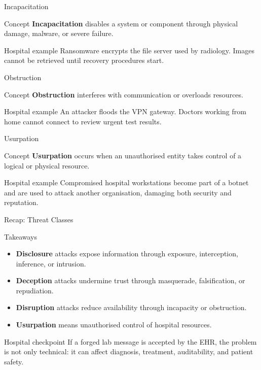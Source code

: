 \documentclass[presentation]{beamer}
\begin{document}
\begin{frame}[c]{Incapacitation}
\begin{block}{Concept}
\textbf{Incapacitation} disables a system or component through physical damage, malware, or severe
failure.
\end{block}

\begin{exampleblock}{Hospital example}
Ransomware encrypts the file server used by radiology. Images cannot be retrieved until recovery
procedures start.
\end{exampleblock}
\end{frame}

\begin{frame}[c]{Obstruction}
\begin{block}{Concept}
\textbf{Obstruction} interferes with communication or overloads resources.
\end{block}

\begin{exampleblock}{Hospital example}
An attacker floods the VPN gateway. Doctors working from home cannot connect to review urgent
test results.
\end{exampleblock}
\end{frame}

\begin{frame}[c]{Usurpation}
\begin{block}{Concept}
\textbf{Usurpation} occurs when an unauthorised entity takes control of a logical or physical
resource.
\end{block}

\begin{exampleblock}{Hospital example}
Compromised hospital workstations become part of a botnet and are used to attack another
organisation, damaging both security and reputation.
\end{exampleblock}
\end{frame}

\begin{frame}[c]{Recap: Threat Classes}
\begin{block}{Takeaways}
\begin{itemize}
    \item \textbf{Disclosure} attacks expose information through exposure, interception, inference, or intrusion.
    \item \textbf{Deception} attacks undermine trust through masquerade, falsification, or repudiation.
    \item \textbf{Disruption} attacks reduce availability through incapacity or obstruction.
    \item \textbf{Usurpation} means unauthorised control of hospital resources.
\end{itemize}
\end{block}

\begin{exampleblock}{Hospital checkpoint}
If a forged lab message is accepted by the EHR, the problem is not only technical: it can affect
diagnosis, treatment, auditability, and patient safety.
\end{exampleblock}
\end{frame}
\end{document}
